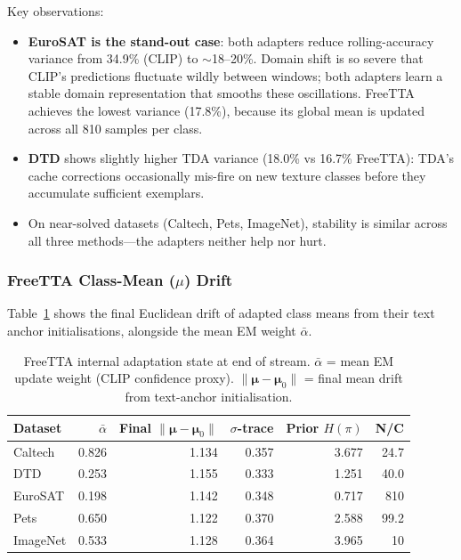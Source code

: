 \documentclass[12pt,a4paper]{article}
\newcommand{\bmu}{\boldsymbol{\mu}}
\newcommand{\1}{\mathbf{1}}
\begin{document}
Key observations:
\begin{itemize}
  \item \textbf{EuroSAT is the stand-out case}: both adapters reduce rolling-accuracy variance from
  34.9\% (CLIP) to $\sim$18--20\%.
  Domain shift is so severe that CLIP's predictions fluctuate wildly between windows;
  both adapters learn a stable domain representation that smooths these oscillations.
  FreeTTA achieves the lowest variance (17.8\%), because its global mean is updated across all 810
  samples per class.
  \item \textbf{DTD} shows slightly higher TDA variance (18.0\% vs 16.7\% FreeTTA): TDA's cache
  corrections occasionally mis-fire on new texture classes before they accumulate sufficient exemplars.
  \item On near-solved datasets (Caltech, Pets, ImageNet), stability is similar across all three
  methods---the adapters neither help nor hurt.
\end{itemize}

\subsubsection{FreeTTA Class-Mean ($\mu$) Drift}

Table~\ref{tab:mu_drift} shows the final Euclidean drift of adapted class means from their text
anchor initialisations, alongside the mean EM weight $\bar{\alpha}$.

\begin{table}[H]
\centering
\caption{FreeTTA internal adaptation state at end of stream.
$\bar{\alpha}$ = mean EM update weight (CLIP confidence proxy).
$\|\bmu - \bmu_0\|$ = final mean drift from text-anchor initialisation.}
\label{tab:mu_drift}
\begin{tabular}{@{}lrrrrr@{}}
\toprule
Dataset & $\bar{\alpha}$ & Final $\|\bmu - \bmu_0\|$ & $\sigma$-trace & Prior $H(\pi)$ & N/C \\
\midrule
Caltech  & 0.826 & 1.134 & 0.357 & 3.677 & 24.7 \\
DTD      & 0.253 & 1.155 & 0.333 & 1.251 & 40.0 \\
EuroSAT  & 0.198 & 1.142 & 0.348 & 0.717 & 810  \\
Pets     & 0.650 & 1.122 & 0.370 & 2.588 & 99.2 \\
ImageNet & 0.533 & 1.128 & 0.364 & 3.965 & 10   \\
\bottomrule
\end{tabular}
\end{table}
\end{document}
